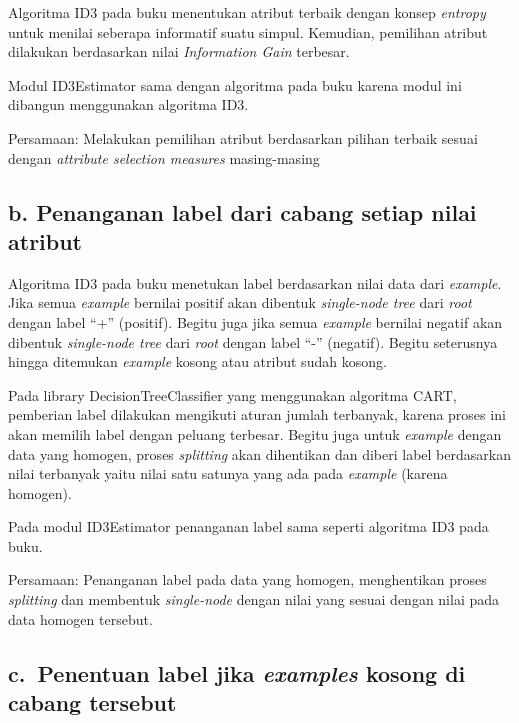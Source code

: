 \documentclass[11pt]{article}
\begin{document}
Algoritma ID3 pada buku menentukan atribut terbaik dengan konsep
\emph{entropy} untuk menilai seberapa informatif suatu simpul. Kemudian,
pemilihan atribut dilakukan berdasarkan nilai \emph{Information Gain}
terbesar.

Modul ID3Estimator sama dengan algoritma pada buku karena modul ini
dibangun menggunakan algoritma ID3.

Persamaan: Melakukan pemilihan atribut berdasarkan pilihan terbaik
sesuai dengan \emph{attribute selection measures} masing-masing

    \hypertarget{b.-penanganan-label-dari-cabang-setiap-nilai-atribut}{%
\subsection{b. Penanganan label dari cabang setiap nilai
atribut}\label{b.-penanganan-label-dari-cabang-setiap-nilai-atribut}}

    Algoritma ID3 pada buku menetukan label berdasarkan nilai data dari
\emph{example}. Jika semua \emph{example} bernilai positif akan dibentuk
\emph{single-node tree} dari \emph{root} dengan label ``+'' (positif).
Begitu juga jika semua \emph{example} bernilai negatif akan dibentuk
\emph{single-node tree} dari \emph{root} dengan label ``-'' (negatif).
Begitu seterusnya hingga ditemukan \emph{example} kosong atau atribut
sudah kosong.

Pada library DecisionTreeClassifier yang menggunakan algoritma CART,
pemberian label dilakukan mengikuti aturan jumlah terbanyak, karena
proses ini akan memilih label dengan peluang terbesar. Begitu juga untuk
\emph{example} dengan data yang homogen, proses \emph{splitting} akan
dihentikan dan diberi label berdasarkan nilai terbanyak yaitu nilai satu
satunya yang ada pada \emph{example} (karena homogen).

Pada modul ID3Estimator penanganan label sama seperti algoritma ID3 pada
buku.

Persamaan: Penanganan label pada data yang homogen, menghentikan proses
\emph{splitting} dan membentuk \emph{single-node} dengan nilai yang
sesuai dengan nilai pada data homogen tersebut.

    \hypertarget{c.-penentuan-label-jika-examples-kosong-di-cabang-tersebut}{%
\subsection{\texorpdfstring{c.~Penentuan label jika \emph{examples}
kosong di cabang
tersebut}{c.~Penentuan label jika examples kosong di cabang tersebut}}\label{c.-penentuan-label-jika-examples-kosong-di-cabang-tersebut}}
\end{document}
